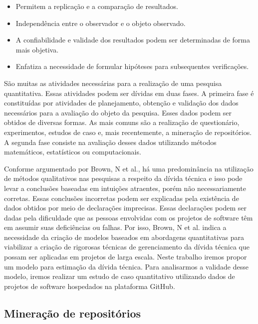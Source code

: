 \begin{itemize}
\item Permitem a replicação e a comparação de resultados.
\item Independência entre o observador e o objeto observado.
\item A confiabilidade e validade dos resultados podem ser determinadas de forma mais objetiva.
\item Enfatiza a necessidade de formular hipóteses para subsequentes verificações.
\end{itemize}

São muitas as atividades necessárias para a realização de uma pesquisa quantitativa. Essas atividades podem ser dívidas em duas fases. A primeira fase é constituídas por atividades de planejamento, obtenção e validação dos dados necessários para a avaliação do objeto da pesquisa. Esses dados podem ser obtidos de diversas formas. As mais comuns são a realização de questionário, experimentos, estudos de caso e, mais recentemente, a mineração de repositórios. A segunda fase consiste na avaliação desses dados utilizando métodos matemáticos, estatísticos ou computacionais.  

Conforme argumentado por Brown, N et al.\cite{brown2010managing}, há uma predominância na utilização de métodos qualitativos nas pesquisas a respeito da dívida técnica e isso pode levar a conclusões baseadas em intuições atraentes, porém não necessariamente corretas. Essas conclusões incorretas podem ser explicadas pela existência de dados obtidos por meio de declarações imprecisas. Essas declarações podem ser dadas pela dificuldade que as pessoas envolvidas com os projetos de software têm em assumir suas deficiências ou falhas. Por isso, Brown, N et al.\cite{brown2010managing} indica a necessidade da criação de modelos baseados em abordagens quantitativas para viabilizar a criação de rigorosas técnicas de gerenciamento da dívida técnica que possam ser aplicadas em projetos de larga escala. Neste trabalho iremos propor um modelo para estimação da dívida técnica. Para analisarmos a validade desse modelo, iremos realizar um estudo de caso quantitativo utilizando dados de projetos de software hospedados na plataforma GitHub. 

\subsection{Mineração de repositórios}

